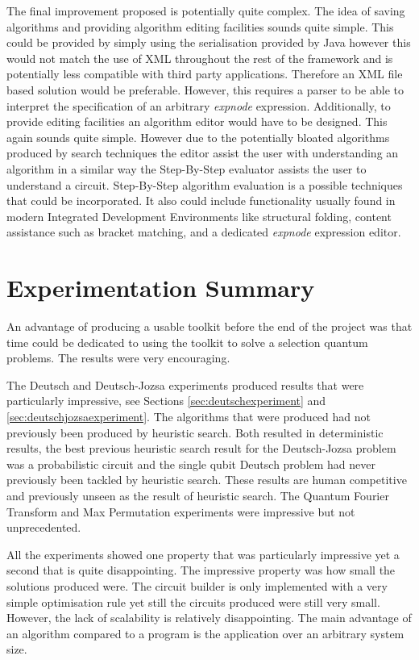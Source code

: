 The final improvement proposed is potentially quite complex.
The idea of saving algorithms and providing algorithm editing facilities sounds quite simple.
This could be provided by simply using the serialisation provided by Java however this would not match the use of XML throughout the rest of the framework and is potentially less compatible with third party applications.
Therefore an XML file based solution would be preferable.
However, this requires a parser to be able to interpret the specification of an arbitrary \emph{expnode} expression.
Additionally, to provide editing facilities an algorithm editor would have to be designed.
This again sounds quite simple.
However due to the potentially bloated algorithms produced by search techniques the editor assist the user with understanding an algorithm in a similar way the Step-By-Step evaluator assists the user to understand a circuit.
Step-By-Step algorithm evaluation is a possible techniques that could be incorporated.
It also could include functionality usually found in modern Integrated Development Environments like structural folding, content assistance such as bracket matching, and a dedicated \emph{expnode} expression editor.

\section{Experimentation Summary}

An advantage of producing a usable toolkit before the end of the project was that time could be dedicated to using the toolkit to solve a selection quantum problems.
The results were very encouraging.

The Deutsch and Deutsch-Jozsa experiments produced results that were particularly impressive, see Sections \ref{sec:deutschexperiment} and \ref{sec:deutschjozsaexperiment}.
The algorithms that were produced had not previously been produced by heuristic search.
Both resulted in deterministic results, the best previous heuristic search result for the Deutsch-Jozsa problem was a probabilistic circuit and the single qubit Deutsch problem had never previously been tackled by heuristic search.
These results are human competitive and previously unseen as the result of heuristic search.
The Quantum Fourier Transform and Max Permutation experiments were impressive but not unprecedented.

All the experiments showed one property that was particularly impressive yet a second that is quite disappointing.
The impressive property was how small the solutions produced were.
The circuit builder is only implemented with a very simple optimisation rule yet still the circuits produced were still very small.
However, the lack of scalability is relatively disappointing.
The main advantage of an algorithm compared to a program is the application over an arbitrary system size.

